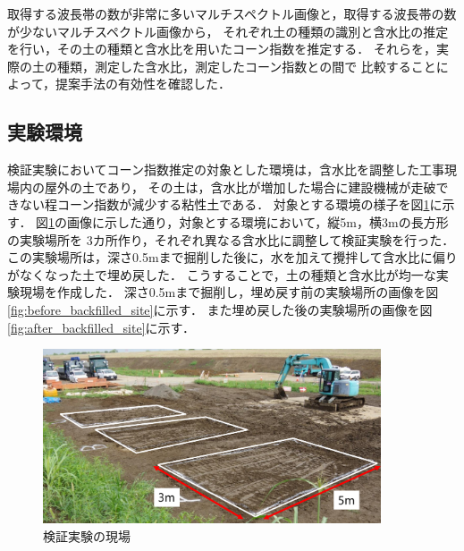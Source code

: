 
取得する波長帯の数が非常に多いマルチスペクトル画像と，取得する波長帯の数が少ないマルチスペクトル画像から，
それぞれ土の種類の識別と含水比の推定を行い，その土の種類と含水比を用いたコーン指数を推定する．
それらを，実際の土の種類，測定した含水比，測定したコーン指数との間で
比較することによって，提案手法の有効性を確認した．

\subsection{実験環境}
\label{ssec:ConeindexEstimationExperimentSetting}


検証実験においてコーン指数推定の対象とした環境は，含水比を調整した工事現場内の屋外の土であり，
その土は，含水比が増加した場合に建設機械が走破できない程コーン指数が減少する粘性土である．
対象とする環境の様子を図\ref{fig:experimental_area}に示す．
図\ref{fig:experimental_area}の画像に示した通り，対象とする環境において，縦5m，横3mの長方形の実験場所を%
3カ所作り，それぞれ異なる含水比に調整して検証実験を行った．
この実験場所は，深さ0.5mまで掘削した後に，水を加えて攪拌して含水比に偏りがなくなった土で埋め戻した．
こうすることで，土の種類と含水比が均一な実験現場を作成した．
深さ0.5mまで掘削し，埋め戻す前の実験場所の画像を図\ref{fig:before_backfilled_site}に示す．
また埋め戻した後の実験場所の画像を図\ref{fig:after_backfilled_site}に示す．

\begin{figure}[b]
      \begin{center}
            \includegraphics[width=10cm]{./Ch5_ConeIndexEstimation/Fig/experimental_area_compressed.pdf}
            \caption{検証実験の現場}
            \label{fig:experimental_area}
      \end{center}
\end{figure}

